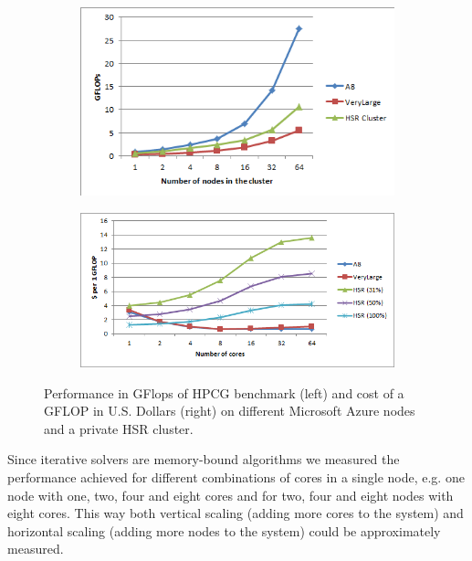 \documentclass[3p,times]{elsarticle}
\begin{document}
\begin{figure}
\centering
\begin{subfigure}{.5\textwidth}
  \centering
			\includegraphics[width=\linewidth]{hpcg}	
  \label{fig:hpcg}
\end{subfigure}%
\begin{subfigure}{.5\textwidth}
  \centering
  \includegraphics[width=\linewidth]{cost}
  \label{fig:cost}
\end{subfigure}
\caption{Performance in GFlops of HPCG benchmark (left) and cost of a GFLOP in U.S. Dollars (right) on different Microsoft Azure nodes and a private HSR cluster. }
\end{figure}

Since iterative solvers are memory-bound algorithms we measured the performance achieved for different combinations of cores in a single node, e.g. one node with one, two, four and eight cores and for two, four and eight nodes with eight cores. This way both vertical scaling (adding more cores to the system) and horizontal scaling (adding more nodes to the system) could be approximately measured. %
\end{document}
